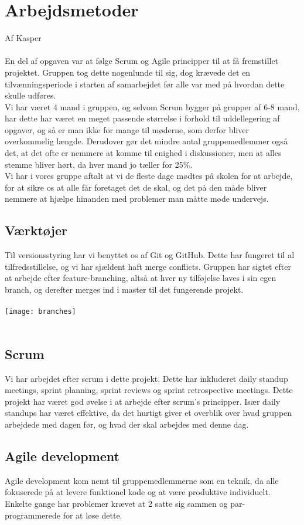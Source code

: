 \section{Arbejdsmetoder}
Af Kasper\\\\
En del af opgaven var at følge Scrum og Agile principper til at få fremstillet projektet. Gruppen tog dette nogenlunde til sig, dog krævede det en tilvænningsperiode i starten af samarbejdet før alle var med på hvordan dette skulle udføres.\\
Vi har været 4 mand i gruppen, og selvom Scrum bygger på grupper af 6-8 mand, har dette har været en meget passende størrelse i forhold til uddellegering af opgaver, og så er man ikke for mange til møderne, som derfor bliver overkommelig længde.
Derudover gør det mindre antal gruppemedlemmer også det, at det ofte er nemmere at komme til enighed i diskussioner, men at alles stemme bliver hørt, da hver mand jo tæller for 25\%.\\
Vi har i vores gruppe aftalt at vi de fleste dage mødtes på skolen for at arbejde, for at sikre os at alle får foretaget det de skal, og det på den måde bliver nemmere at hjælpe hinanden med problemer man måtte møde undervejs.

\subsection{Værktøjer}
Til versionsstyring har vi benyttet os af Git og GitHub. Dette har fungeret til al tilfredsstillelse, og vi har sjældent haft merge conflicts. Gruppen har sigtet efter at arbejde efter feature-branching, altså at hver ny tilføjelse laves i sin egen branch, og derefter merges ind i master til det fungerende projekt.\\\\
\texttt{[image: branches]}\\\\


\subsection{Scrum}
Vi har arbejdet efter scrum i dette projekt. Dette har inkluderet daily standup meetings, sprint planning, sprint reviews og sprint retrospective meetings. Dette projekt har været god øvelse i at arbejde efter scrum's principper. Især daily standups har været effektive, da det hurtigt giver et overblik over hvad gruppen arbejdede med dagen før, og hvad der skal arbejdes med denne dag.

\subsection{Agile development}
Agile development kom nemt til gruppemedlemmerne som en teknik, da alle fokuserede på at levere funktionel kode og at være produktive individuelt. Enkelte gange har problemer krævet at 2 satte sig sammen og par-programmerede for at løse dette.